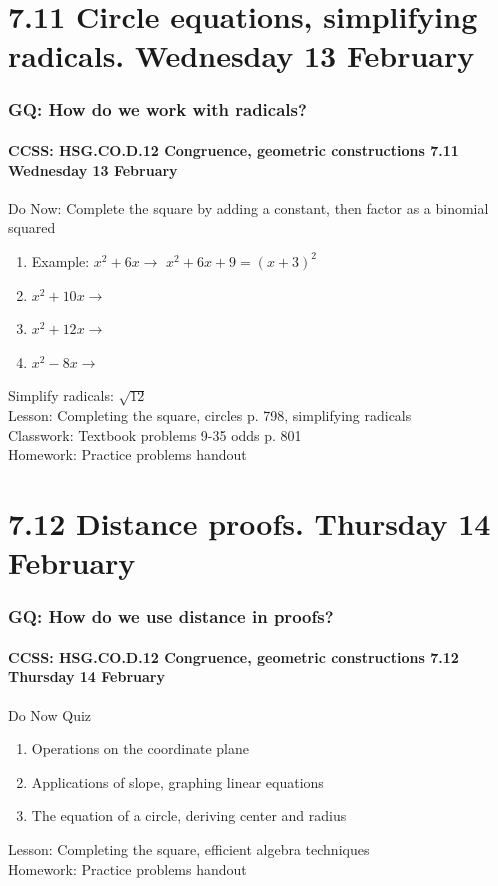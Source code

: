 \documentclass{beamer}
\begin{document}
\section{7.11 Circle equations, simplifying radicals. Wednesday 13 February}
  \frame
  {
    \frametitle{GQ: How do we work with radicals?}
    \framesubtitle{CCSS: HSG.CO.D.12 Congruence, geometric constructions \hfill \alert{7.11 Wednesday 13 February}}

    \begin{block}{Do Now: Complete the square by adding a constant, then factor as a binomial squared}
      \begin{enumerate}
        \item Example: $x^2+6x \rightarrow$ \qquad $x^2+6x+9=(x+3)^2$
        \item $x^2+10x \rightarrow$
        \item $x^2+12x \rightarrow$
        \item $x^2-8x \rightarrow$
      \end{enumerate}
    \end{block}
    Simplify radicals: $\sqrt{12}$\\
    Lesson: Completing the square, circles p. 798, simplifying radicals\\
    Classwork: Textbook problems 9-35 odds p. 801\\[0.5cm]
    Homework: Practice problems handout
  }

\section{7.12 Distance proofs. Thursday 14 February}
  \frame
  {
    \frametitle{GQ: How do we use distance in proofs?}
    \framesubtitle{CCSS: HSG.CO.D.12 Congruence, geometric constructions \hfill \alert{7.12 Thursday 14 February}}

    \begin{block}{Do Now Quiz}
      \begin{enumerate}
        \item Operations on the coordinate plane
        \item Applications of slope, graphing linear equations
        \item The equation of a circle, deriving center and radius
      \end{enumerate}
    \end{block}
    Lesson: Completing the square, efficient algebra techniques\\[0.5cm]
    Homework: Practice problems handout
  }
\end{document}
